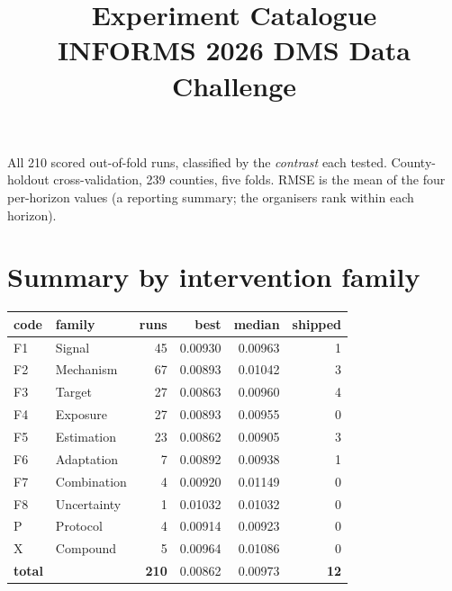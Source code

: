 \documentclass[9pt,landscape]{article}
\title{\vspace{-2em}\textbf{Experiment Catalogue}\\[2pt]\large INFORMS 2026 DMS Data Challenge}
\author{}
\date{}
\begin{document}
\maketitle
\vspace{-2em}
\noindent All 210 scored out-of-fold runs, classified by the \emph{contrast} each tested.
County-holdout cross-validation, 239 counties, five folds. RMSE is the mean of the four
per-horizon values (a reporting summary; the organisers rank within each horizon).

\section*{Summary by intervention family}
\begin{tabular}{@{}llrrrr@{}}\toprule
code & family & runs & best & median & shipped \\ \midrule
F1 & Signal & 45 & 0.00930 & 0.00963 & 1 \\
F2 & Mechanism & 67 & 0.00893 & 0.01042 & 3 \\
F3 & Target & 27 & 0.00863 & 0.00960 & 4 \\
F4 & Exposure & 27 & 0.00893 & 0.00955 & 0 \\
F5 & Estimation & 23 & 0.00862 & 0.00905 & 3 \\
F6 & Adaptation & 7 & 0.00892 & 0.00938 & 1 \\
F7 & Combination & 4 & 0.00920 & 0.01149 & 0 \\
F8 & Uncertainty & 1 & 0.01032 & 0.01032 & 0 \\
P & Protocol & 4 & 0.00914 & 0.00923 & 0 \\
X & Compound & 5 & 0.00964 & 0.01086 & 0 \\
\midrule \textbf{total} & & \textbf{210} & 0.00862 & 0.00973 & \textbf{12} \\
\bottomrule\end{tabular}
\end{document}
